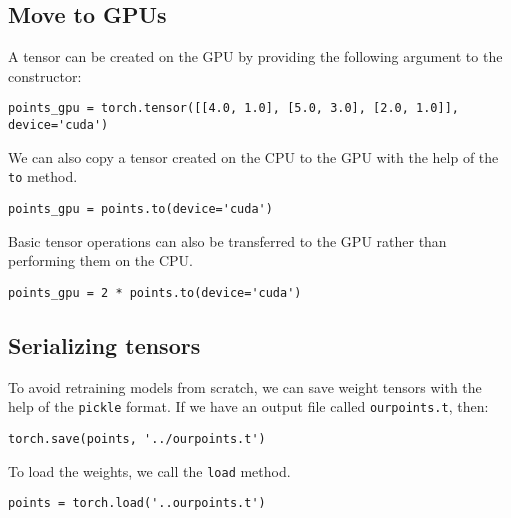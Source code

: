 \documentclass[11pt]{article}
\begin{document}
\subsection{Move to GPUs}
\label{sec:org5fae4ff}
A tensor can be created on the GPU by providing the following argument to the constructor:
\begin{verbatim}
points_gpu = torch.tensor([[4.0, 1.0], [5.0, 3.0], [2.0, 1.0]], device='cuda')
\end{verbatim}
We can also copy a tensor created on the CPU to the GPU with the help of the \texttt{to} method.
\begin{verbatim}
points_gpu = points.to(device='cuda')
\end{verbatim}
Basic tensor operations can also be transferred to the GPU rather than performing them on the CPU.
\begin{verbatim}
points_gpu = 2 * points.to(device='cuda')
\end{verbatim}

\subsection{Serializing tensors}
\label{sec:orgac39d48}
To avoid retraining models from scratch, we can save weight tensors with the help of the \texttt{pickle} format. If we have an output file called \texttt{ourpoints.t}, then:
\begin{verbatim}
torch.save(points, '../ourpoints.t')
\end{verbatim}
To load the weights, we call the \texttt{load} method.
\begin{verbatim}
points = torch.load('..ourpoints.t')
\end{verbatim}
\end{document}
